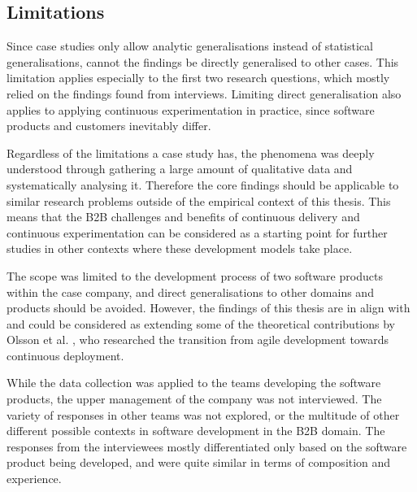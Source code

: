 \documentclass[english]{tktltiki2}
\theoremstyle{definition}
\theoremstyle{remark}
\begin{document}

\subsection{Limitations}
Since case studies only allow analytic generalisations instead of statistical generalisations, cannot the findings be directly generalised to other cases. This limitation applies especially to the first two research questions, which mostly relied on the findings found from interviews. Limiting direct generalisation also applies to applying continuous experimentation in practice, since software products and customers inevitably differ. 

Regardless of the limitations a case study has, the phenomena was deeply understood through gathering a large amount of qualitative data and systematically analysing it. %
Therefore the core findings should be applicable to similar research problems outside of the empirical context of this thesis. This means that the B2B challenges and benefits of continuous delivery and continuous experimentation can be considered as a starting point for further studies in other contexts where these development models take place.

The scope was limited to the development process of two software products within the case company, and direct generalisations to other domains and products should be avoided. However, the findings of this thesis are in align with and could be considered as extending some of the theoretical contributions by Olsson et al. \cite{olsson2012climbing}, who researched the transition from agile development towards continuous deployment. 

While the data collection was applied to the teams developing the software products, the upper management of the company was not interviewed. The variety of responses in other teams was not explored, or the multitude of other different possible contexts in software development in the B2B domain. The responses from the interviewees mostly differentiated only based on the software product being developed, and were quite similar in terms of composition and experience.
\end{document}

